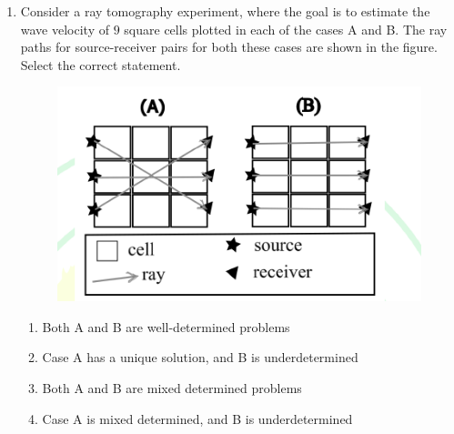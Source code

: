 \documentclass[journal,12pt,onecolumn]{IEEEtran}
\theoremstyle{remark}
\begin{document}
\begin{enumerate}
\item Consider a ray tomography experiment, where the goal is to estimate the wave velocity of $9$ square cells plotted in each of the cases A and B. The ray paths for source-receiver pairs for both these cases are shown in the figure. Select the correct statement.
\begin{figure}[H]
    \centering
    \includegraphics[width=0.6\columnwidth]{figs/fig10.png}
    \caption{}
    \label{fig:q50}
\end{figure}
\hfill{}
\begin{enumerate}
    \item Both A and B are well-determined problems
    \item Case A has a unique solution, and B is underdetermined
    \item Both A and B are mixed determined problems
    \item Case A is mixed determined, and B is underdetermined
\end{enumerate}


\end{enumerate}
\end{document}
